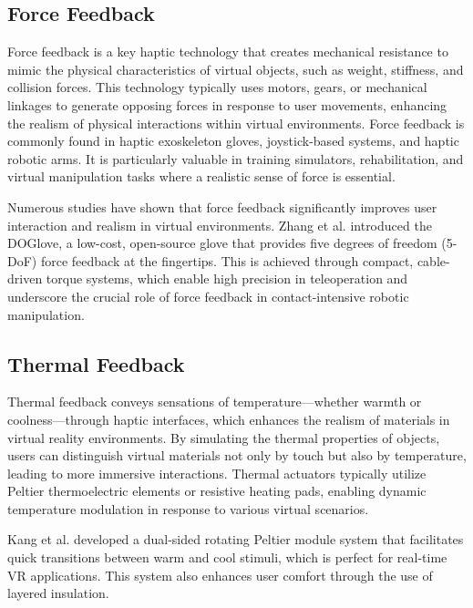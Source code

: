 \newpage
\subsection{Force Feedback}
Force feedback is a key haptic technology that creates mechanical resistance to mimic the physical characteristics of virtual objects, such as weight, stiffness, and collision forces. This technology typically uses motors, gears, or mechanical linkages to generate opposing forces in response to user movements, enhancing the realism of physical interactions within virtual environments. Force feedback is commonly found in haptic exoskeleton gloves, joystick-based systems, and haptic robotic arms. It is particularly valuable in training simulators, rehabilitation, and virtual manipulation tasks where a realistic sense of force is essential\cite{10.3389/fbioe.2020.541105}.

Numerous studies have shown that force feedback significantly improves user interaction and realism in virtual environments. Zhang et al.\cite{zhang2025doglovedexterousmanipulationlowcost} introduced the DOGlove, a low-cost, open-source glove that provides five degrees of freedom (5-DoF) force feedback at the fingertips. This is achieved through compact, cable-driven torque systems, which enable high precision in teleoperation and underscore the crucial role of force feedback in contact-intensive robotic manipulation.

\subsection{Thermal Feedback}
Thermal feedback conveys sensations of temperature—whether warmth or coolness—through haptic interfaces, which enhances the realism of materials in virtual reality environments. By simulating the thermal properties of objects, users can distinguish virtual materials not only by touch but also by temperature, leading to more immersive interactions. Thermal actuators typically utilize Peltier thermoelectric elements or resistive heating pads, enabling dynamic temperature modulation in response to various virtual scenarios\cite{TANG2024100365}.

Kang et al.\cite{10.48550/arXiv.2405.11807} developed a dual-sided rotating Peltier module system that facilitates quick transitions between warm and cool stimuli, which is perfect for real-time VR applications. This system also enhances user comfort through the use of layered insulation.

\newpage
